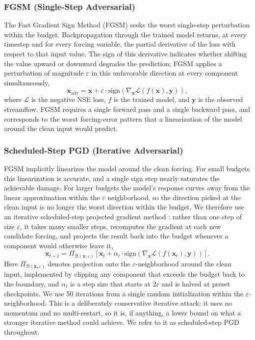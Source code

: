 \documentclass[final]{agujournal2019}
\begin{document}
\subsubsection{FGSM (Single-Step Adversarial)}

The Fast Gradient Sign Method (FGSM) seeks the worst single-step perturbation within the budget. Backpropagation through the trained model returns, at every timestep and for every forcing variable, the partial derivative of the loss with respect to that input value. The sign of this derivative indicates whether shifting the value upward or downward degrades the prediction; FGSM applies a perturbation of magnitude $\varepsilon$ in this unfavorable direction at every component simultaneously,
\begin{equation}
\mathbf{x}_{\mathrm{adv}} = \mathbf{x} + \varepsilon \cdot \mathrm{sign}\!\left(\nabla_{\mathbf{x}} \mathcal{L}(f(\mathbf{x}), \mathbf{y})\right),
\end{equation}
where $\mathcal{L}$ is the negative NSE loss, $f$ is the trained model, and $\mathbf{y}$ is the observed streamflow. FGSM requires a single forward pass and a single backward pass, and corresponds to the worst forcing-error pattern that a linearization of the model around the clean input would predict.

\subsubsection{Scheduled-Step PGD (Iterative Adversarial)}

FGSM implicitly linearizes the model around the clean forcing. For small budgets this linearization is accurate, and a single sign step nearly saturates the achievable damage. For larger budgets the model's response curves away from the linear approximation within the $\varepsilon$ neighborhood, so the direction picked at the clean input is no longer the worst direction within the budget. We therefore use an iterative scheduled-step projected gradient method \cite{Croce2020}: rather than one step of size $\varepsilon$, it takes many smaller steps, recomputes the gradient at each new candidate forcing, and projects the result back into the budget whenever a component would otherwise leave it,
\begin{equation}
\mathbf{x}_{t+1} = \Pi_{\mathcal{B}(\mathbf{x}, \varepsilon)} \left[ \mathbf{x}_{t} + \alpha_t \cdot \mathrm{sign}\!\left(\nabla_{\mathbf{x}} \mathcal{L}(f(\mathbf{x}_{t}), \mathbf{y})\right) \right].
\end{equation}
Here $\Pi_{\mathcal{B}(\mathbf{x},\varepsilon)}$ denotes projection onto the $\varepsilon$-neighborhood around the clean input, implemented by clipping any component that exceeds the budget back to the boundary, and $\alpha_t$ is a step size that starts at $2\varepsilon$ and is halved at preset checkpoints. We use 50 iterations from a single random initialization within the $\varepsilon$-neighborhood. This is a deliberately conservative iterative attack: it uses no momentum and no multi-restart, so it is, if anything, a lower bound on what a stronger iterative method could achieve. We refer to it as scheduled-step PGD throughout.
\end{document}

